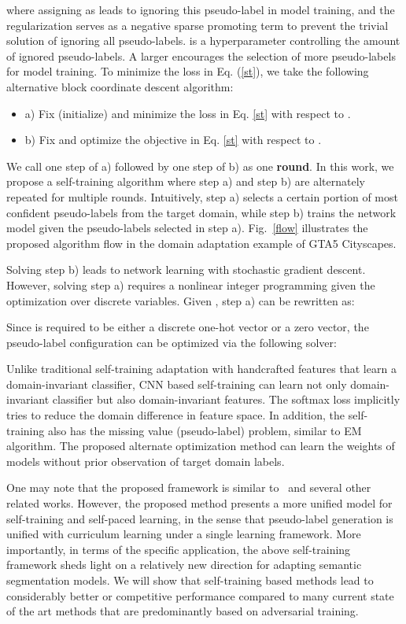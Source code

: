 \documentclass[runningheads]{llncs}
\begin{document}
where assigning  as  leads to ignoring this pseudo-label in model training, and the  regularization serves as a negative sparse promoting term to prevent the trivial solution of ignoring all pseudo-labels.  is a hyperparameter controlling the amount of ignored pseudo-labels. A larger  encourages the selection of more pseudo-labels for model training. To minimize the loss in Eq. (\ref{st}), we take the following alternative block coordinate descent algorithm:
\begin{itemize}
\item a) Fix (initialize)  and minimize the loss in Eq. \ref{st} with respect to .
\item b) Fix  and optimize the objective in Eq. \ref{st} with respect to .
\end{itemize}
We call one step of a) followed by one step of b) as one \textbf{round}. In this work, we propose a self-training algorithm where step a) and step b) are alternately repeated for multiple rounds. Intuitively, step a) selects a certain portion of most confident pseudo-labels from the target domain, while step b) trains the network model given the pseudo-labels selected in step a). Fig.~\ref{flow} illustrates the proposed algorithm flow in the domain adaptation example of GTA5  Cityscapes.

Solving step b) leads to network learning with stochastic gradient descent. However, solving step a) requires a nonlinear integer programming given the optimization over discrete variables. Given , step a) can be rewritten as:

Since  is required to be either a discrete one-hot vector or a zero vector, the pseudo-label configuration can be optimized via the following solver:

Unlike traditional self-training adaptation with handcrafted features that learn a domain-invariant classifier, CNN based self-training can learn not only domain-invariant classifier but also domain-invariant features. The softmax loss implicitly tries to reduce the domain difference in feature space. In addition, the self-training also has the missing value (pseudo-label) problem, similar to EM algorithm. The proposed alternate optimization method can learn the weights of models without prior observation of target domain labels.

One may note that the proposed framework is similar to~\cite{tang2012shifting} and several other related works. However, the proposed method presents a more unified model for self-training and self-paced learning, in the sense that pseudo-label generation is unified with curriculum learning under a single learning framework. More importantly, in terms of the specific application, the above self-training framework sheds light on a relatively new direction for adapting semantic segmentation models. We will show that self-training based methods lead to considerably better or competitive performance compared to many current state of the art methods that are predominantly based on adversarial training.
\end{document}
